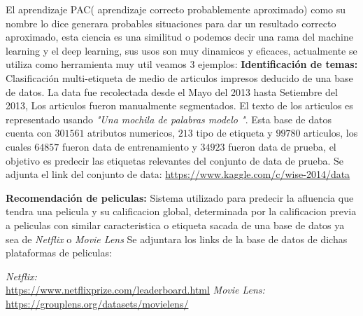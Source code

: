 \documentclass{vgtc}                          %
\begin{document}
El aprendizaje PAC( aprendizaje correcto probablemente aproximado) como su
nombre lo dice generara probables situaciones para dar un resultado
correcto aproximado, esta ciencia es una similitud o podemos decir una
rama del machine learning y el deep learning, sus usos son muy dinamicos y
eficaces, actualmente se utiliza como herramienta muy util veamos 3
ejemplos:
\newline
\newline
\textbf{Identificación de temas: }
Clasificación multi-etiqueta de medio de articulos impresos deducido
de una base de datos.
\newline
\newline
La data fue recolectada desde el Mayo del 2013 hasta Setiembre del 2013,
\newline
\newline
Los articulos fueron manualmente segmentados.
\newline
\newline
El texto de los articulos es representado usando \textit{"Una mochila de
palabras modelo "}.
\newline
\newline
Esta base de datos cuenta con $301 561$ atributos numericos, $213$ tipo de
etiqueta y $99 780$ articulos, los cuales $64 857$ fueron data de 
entrenamiento y $34 923$ fueron data de prueba, el objetivo es predecir 
las etiquetas relevantes del conjunto de data de prueba.
\newline
\newline
Se adjunta el link del conjunto de data:
\newline
\newline
\url{https://www.kaggle.com/c/wise-2014/data}
\newline
\newline

\textbf{Recomendación de peliculas: }
Sistema utilizado para predecir la afluencia que tendra una pelicula y su calificacion 
global, determinada por la calificacion previa a peliculas con similar caracteristica 
o etiqueta sacada de una base de datos ya sea de \textit{Netflix} o \textit{Movie Lens}
\newline
\newline
Se adjuntara los links de la base de datos de dichas plataformas de peliculas:

\textit{Netflix: \\}  \url{https://www.netflixprize.com/leaderboard.html}
\newline
\newline
\textit{Movie Lens:\\ } \url{https://grouplens.org/datasets/movielens/}
\newline
\newline
\end{document}
